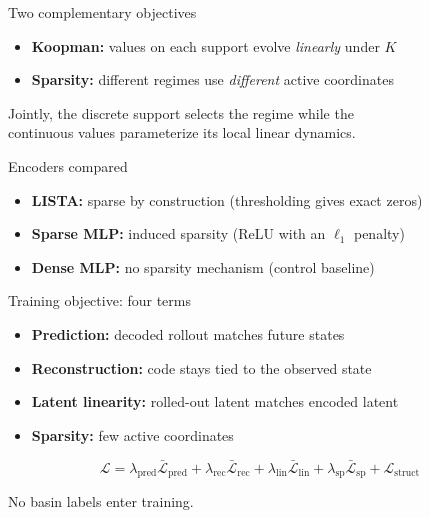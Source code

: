 \documentclass[aspectratio=169,10pt]{beamer}
\newcommand{\emphc}[1]{{\color{skaeorange}\bfseries #1}}
\newcommand{\emphp}[1]{{\color{skaepurple}\bfseries #1}}
\newcommand{\empht}[1]{{\color{skaeteal}\bfseries #1}}
\newenvironment{points}{\large\begin{itemize}\setlength{\itemsep}{0.85em}}{\end{itemize}}
\begin{document}
\begin{frame}{Two complementary objectives}
  \vfill
  \begin{points}
    \item \emphp{Koopman:} values on each support evolve \emph{linearly} under $K$
    \item \empht{Sparsity:} different regimes use \emph{different} active coordinates
  \end{points}
  \vfill
  \begin{center}\large\color{skaeink}
  Jointly, the discrete support selects the regime while the\\ continuous values parameterize its local linear dynamics.
  \end{center}
  \vfill
\end{frame}


\begin{frame}{Encoders compared}
  \vfill
  \begin{points}
    \item \emphp{LISTA:} sparse by construction (thresholding gives exact zeros)
    \item \empht{Sparse MLP:} induced sparsity (ReLU with an $\ell_1$ penalty)
    \item \emphc{Dense MLP:} no sparsity mechanism (control baseline)
  \end{points}
  \vfill
\end{frame}

\begin{frame}{Training objective: four terms}
  \vfill
  \begin{points}
    \item \emphc{Prediction:} decoded rollout matches future states
    \item \empht{Reconstruction:} code stays tied to the observed state
    \item \emphp{Latent linearity:} rolled-out latent matches encoded latent
    \item \emphp{Sparsity:} few active coordinates
  \end{points}
  \vfill
  \[
    \mathcal{L}=\lambda_{\text{pred}}\bar{\mathcal{L}}_{\text{pred}}
      +\lambda_{\text{rec}}\bar{\mathcal{L}}_{\text{rec}}
      +\lambda_{\text{lin}}\bar{\mathcal{L}}_{\text{lin}}
      +\lambda_{\text{sp}}\bar{\mathcal{L}}_{\text{sp}}
      +\mathcal{L}_{\text{struct}}
  \]
  \vspace{0.2em}
  \begin{center}\small\color{skaegray} No basin labels enter training.\end{center}
\end{frame}
\end{document}
